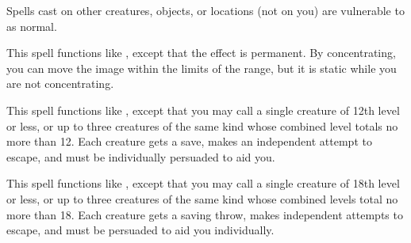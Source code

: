 \begin{spellnotes}
Spells cast on other creatures, objects, or locations (not on you) are vulnerable to  as normal.
\end{spellnotes}

\begin{spelleffect}
This spell functions like , except that the effect is permanent. By concentrating, you can move the image within the limits of the range, but it is static while you are not concentrating.
\end{spelleffect}

\begin{spelleffect}
This spell functions like , except that you may call a single creature of 12th level or less, or up to three creatures of the same kind whose combined level totals no more than 12. Each creature gets a save, makes an independent attempt to escape, and must be individually persuaded to aid you.
\end{spelleffect}

\begin{spelleffect}
This spell functions like , except that you may call a single creature of 18th level or less, or up to three creatures of the same kind whose combined levels total no more than 18. Each creature gets a saving throw, makes independent attempts to escape, and must be persuaded to aid you individually.
\end{spelleffect}

